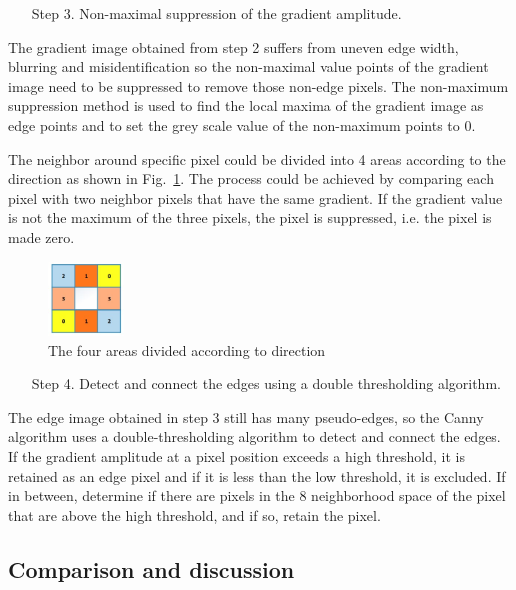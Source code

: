 \documentclass[hyperref]{article}
\theoremstyle{nonumberplain}
\begin{document}
	\begin{itemize}
		\item[Step 3.]  Non-maximal suppression of the gradient amplitude.
	\end{itemize}

	The gradient image obtained from step 2 suffers from uneven edge width, blurring and misidentification so the non-maximal value points of the gradient image need to be suppressed to remove those non-edge pixels. The non-maximum suppression method is used to find the local maxima of the gradient image as edge points and to set the grey scale value of the non-maximum points to 0.
	
	The neighbor around specific pixel could be divided into 4 areas according to the direction as shown in Fig.~\ref{fig15}. The process could be achieved by comparing each pixel with two neighbor pixels that have the same gradient. If the gradient value is not the maximum of the three pixels, the pixel is suppressed, i.e. the pixel is made zero.
	
	\begin{figure}[h]
		\centering
			\includegraphics[width=2cm]{fig15.jpg}
		\caption{The four areas divided according to direction}
		\label{fig15}
	\end{figure}
	
	\begin{itemize}
		\item[Step 4.]  Detect and connect the edges using a double thresholding algorithm.
	\end{itemize}

	The edge image obtained in step 3 still has many pseudo-edges, so the Canny algorithm uses a double-thresholding algorithm to detect and connect the edges. If the gradient amplitude at a pixel position exceeds a high threshold, it is retained as an edge pixel and if it is less than the low threshold, it is excluded. If in between, determine if there are pixels in the 8 neighborhood space of the pixel that are above the high threshold, and if so, retain the pixel.
	
	\subsection{Comparison and discussion}
	
\end{document}
